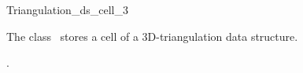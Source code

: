 

\begin{ccRefClass}{Triangulation_ds_cell_3}  %


\ccDefinition
  
The class \ccRefName\ stores a cell of a 3D-triangulation data structure.


\ccIsModel


\ccSeeAlso

.



\end{ccRefClass}


